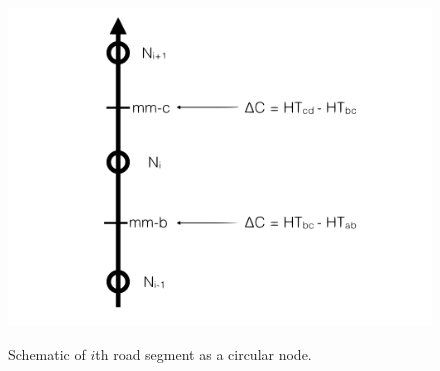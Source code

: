 \begin{figure}[h]
\centering
\includegraphics[width=\textwidth]{img/macro-traffic.png}\\
\caption{Schematic of $i$th road segment as a circular node.}
\label{fig:ODE-schematic}
\end{figure}